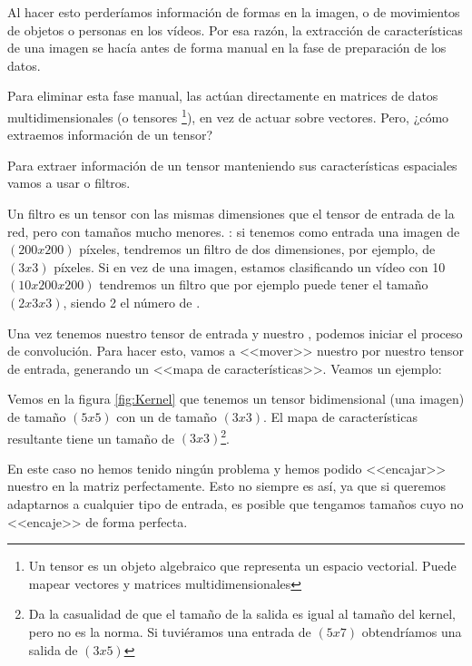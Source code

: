 \begin{itemize}
\begin{enumerate}
                Al hacer esto perderíamos información de formas en la imagen, o de movimientos de objetos o personas en los vídeos. Por esa razón, la extracción de características de una imagen se hacía antes de forma manual en la fase de preparación de los datos.

                Para eliminar esta fase manual, las  actúan directamente en matrices de datos multidimensionales (o tensores \footnote{Un tensor es un objeto algebraico que representa un espacio vectorial. Puede mapear vectores y matrices multidimensionales }), en vez de actuar sobre vectores. Pero, ¿cómo extraemos información de un tensor?

                Para extraer información de un tensor manteniendo sus características espaciales vamos a usar  o filtros.

                Un filtro es un tensor con las mismas dimensiones que el tensor de entrada de la red, pero con tamaños mucho menores. \pe: si tenemos como entrada una imagen de $(200x200)$ píxeles, tendremos un filtro de dos dimensiones, por ejemplo, de $(3x3)$ píxeles. Si en vez de una imagen, estamos clasificando un vídeo con 10  $(10x200x200)$ tendremos un filtro que por ejemplo puede tener el tamaño $(2x3x3)$, siendo 2 el número de .

                Una vez tenemos nuestro tensor de entrada y nuestro , podemos iniciar el proceso de convolución. Para hacer esto, vamos a <<mover>> nuestro  por nuestro tensor de entrada, generando un <<mapa de características>>. Veamos un ejemplo:


                Vemos en la figura \ref{fig:Kernel} que tenemos un tensor bidimensional (\pe una imagen) de tamaño $(5x5)$ con un  de tamaño $(3x3)$. El mapa de características resultante tiene un tamaño de $(3x3)$\footnote{Da la casualidad de que el tamaño de la salida es igual al tamaño del kernel, pero no es la norma. Si tuviéramos una entrada de $(5x7)$ obtendríamos una salida de $(3x5)$}.

                En este caso no hemos tenido ningún problema y hemos podido <<encajar>> nuestro  en la matriz perfectamente. Esto no siempre es así, ya que si queremos adaptarnos a cualquier tipo de entrada, es posible que tengamos tamaños cuyo  no <<encaje>> de forma perfecta.


\end{enumerate}
\end{itemize}
